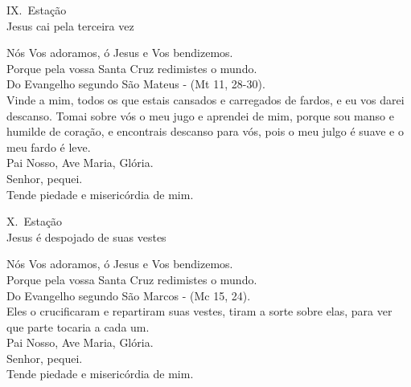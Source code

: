\documentclass{book}
\begin{document}
\newpage
\begin{center}
    IX.\ Estação \\ Jesus cai pela terceira vez
\end{center}
\begin{flushleft}
    \VbarRed{} Nós Vos adoramos, ó Jesus e Vos bendizemos. \\
    \RbarRed{} Porque pela vossa Santa Cruz redimistes o mundo.
    \vspace{.2cm} \\
    Do Evangelho segundo São Mateus - (\textcolor{VioletRed2}{Mt 11, 28-30}).
    \vspace{.2cm} \\
    Vinde a mim, todos os que estais cansados e carregados de fardos, e eu vos darei descanso. Tomai sobre vós o meu jugo e aprendei de mim, porque sou manso e humilde de coração, e encontrais descanso para vós, pois o meu julgo é suave e o meu fardo é leve.
    \vspace{.2cm} \\
    Pai Nosso, Ave Maria, Glória.
    \vspace{.2cm} \\
    \VbarRed{} Senhor, pequei. \\
    \RbarRed{} Tende piedade e misericórdia de mim.
\end{flushleft}
\begin{center}
    X.\ Estação \\ Jesus é despojado de suas vestes
\end{center}
\begin{flushleft}
    \VbarRed{} Nós Vos adoramos, ó Jesus e Vos bendizemos. \\
    \RbarRed{} Porque pela vossa Santa Cruz redimistes o mundo.
    \vspace{.2cm} \\
    Do Evangelho segundo São Marcos - (\textcolor{VioletRed2}{Mc 15, 24}).
    \vspace{.2cm} \\
    Eles o crucificaram e repartiram suas vestes, tiram a sorte sobre elas, para ver que parte tocaria a cada um.
    \vspace{.2cm} \\
    Pai Nosso, Ave Maria, Glória.
    \vspace{.2cm} \\
    \VbarRed{} Senhor, pequei. \\
    \RbarRed{} Tende piedade e misericórdia de mim.
\end{flushleft}
\end{document}
